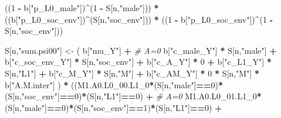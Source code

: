\documentclass[
]{book}
\newenvironment{Shaded}{\begin{snugshade}}{\end{snugshade}}
\newcommand{\CommentTok}[1]{\textcolor[rgb]{0.56,0.35,0.01}{\textit{#1}}}
\newcommand{\DecValTok}[1]{\textcolor[rgb]{0.00,0.00,0.81}{#1}}
\newcommand{\NormalTok}[1]{#1}
\newcommand{\OtherTok}[1]{\textcolor[rgb]{0.56,0.35,0.01}{#1}}
\newcommand{\SpecialCharTok}[1]{\textcolor[rgb]{0.81,0.36,0.00}{\textbf{#1}}}
\newcommand{\StringTok}[1]{\textcolor[rgb]{0.31,0.60,0.02}{#1}}
\begin{document}
\begin{Shaded}
\begin{Highlighting}[]
\NormalTok{      ((}\DecValTok{1} \SpecialCharTok{{-}}\NormalTok{ b[}\StringTok{"p\_L0\_male"}\NormalTok{])}\SpecialCharTok{\^{}}\NormalTok{(}\DecValTok{1} \SpecialCharTok{{-}}\NormalTok{ S[n,}\StringTok{"male"}\NormalTok{])) }\SpecialCharTok{*} 
\NormalTok{      ((b[}\StringTok{"p\_L0\_soc\_env"}\NormalTok{])}\SpecialCharTok{\^{}}\NormalTok{(S[n,}\StringTok{"soc\_env"}\NormalTok{])) }\SpecialCharTok{*}
\NormalTok{      ((}\DecValTok{1} \SpecialCharTok{{-}}\NormalTok{ b[}\StringTok{"p\_L0\_soc\_env"}\NormalTok{])}\SpecialCharTok{\^{}}\NormalTok{(}\DecValTok{1} \SpecialCharTok{{-}}\NormalTok{ S[n,}\StringTok{"soc\_env"}\NormalTok{])) }
    
\NormalTok{    S[n,}\StringTok{"sum.psi00"}\NormalTok{] }\OtherTok{\textless{}{-}}\NormalTok{  ( b[}\StringTok{"mu\_Y"}\NormalTok{] }\SpecialCharTok{+}                                          \CommentTok{\# A=0}
\NormalTok{                             b[}\StringTok{"c\_male\_Y"}\NormalTok{] }\SpecialCharTok{*}\NormalTok{ S[n,}\StringTok{"male"}\NormalTok{] }\SpecialCharTok{+} 
\NormalTok{                             b[}\StringTok{"c\_soc\_env\_Y"}\NormalTok{] }\SpecialCharTok{*}\NormalTok{ S[n,}\StringTok{"soc\_env"}\NormalTok{] }\SpecialCharTok{+} 
\NormalTok{                             b[}\StringTok{"c\_A\_Y"}\NormalTok{] }\SpecialCharTok{*} \DecValTok{0} \SpecialCharTok{+} 
\NormalTok{                             b[}\StringTok{"c\_L1\_Y"}\NormalTok{] }\SpecialCharTok{*}\NormalTok{ S[n,}\StringTok{"L1"}\NormalTok{] }\SpecialCharTok{+}
\NormalTok{                             b[}\StringTok{"c\_M\_Y"}\NormalTok{] }\SpecialCharTok{*}\NormalTok{ S[n,}\StringTok{"M"}\NormalTok{] }\SpecialCharTok{+}
\NormalTok{                             b[}\StringTok{"c\_AM\_Y"}\NormalTok{] }\SpecialCharTok{*} \DecValTok{0} \SpecialCharTok{*}\NormalTok{ S[n,}\StringTok{"M"}\NormalTok{] }\SpecialCharTok{*}\NormalTok{ b[}\StringTok{"A.M.inter"}\NormalTok{] ) }\SpecialCharTok{*}
\NormalTok{      ((M1.A0.L0\_00.L1\_0}\SpecialCharTok{*}\NormalTok{(S[n,}\StringTok{"male"}\NormalTok{]}\SpecialCharTok{==}\DecValTok{0}\NormalTok{)}\SpecialCharTok{*}\NormalTok{(S[n,}\StringTok{"soc\_env"}\NormalTok{]}\SpecialCharTok{==}\DecValTok{0}\NormalTok{)}\SpecialCharTok{*}\NormalTok{(S[n,}\StringTok{"L1"}\NormalTok{]}\SpecialCharTok{==}\DecValTok{0}\NormalTok{) }\SpecialCharTok{+} \CommentTok{\# A\textquotesingle{}=0}
\NormalTok{          M1.A0.L0\_01.L1\_0}\SpecialCharTok{*}\NormalTok{(S[n,}\StringTok{"male"}\NormalTok{]}\SpecialCharTok{==}\DecValTok{0}\NormalTok{)}\SpecialCharTok{*}\NormalTok{(S[n,}\StringTok{"soc\_env"}\NormalTok{]}\SpecialCharTok{==}\DecValTok{1}\NormalTok{)}\SpecialCharTok{*}\NormalTok{(S[n,}\StringTok{"L1"}\NormalTok{]}\SpecialCharTok{==}\DecValTok{0}\NormalTok{) }\SpecialCharTok{+}

\end{Highlighting}
\end{Shaded}
\end{document}
